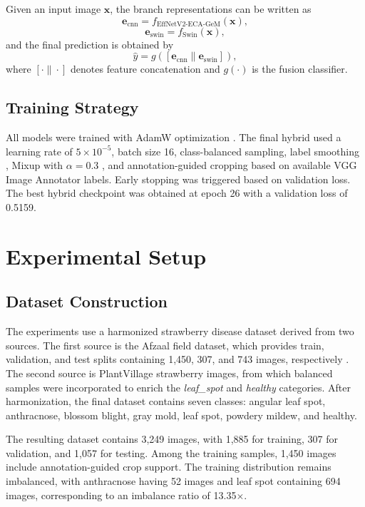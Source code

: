 \documentclass[conference]{IEEEtran}
\begin{document}
Given an input image $\mathbf{x}$, the branch representations can be written as
\begin{equation}
\mathbf{e}_{\text{cnn}} = f_{\text{EffNetV2-ECA-GeM}}(\mathbf{x}),
\end{equation}
\begin{equation}
\mathbf{e}_{\text{swin}} = f_{\text{Swin}}(\mathbf{x}),
\end{equation}
and the final prediction is obtained by
\begin{equation}
\hat{y} = g([\mathbf{e}_{\text{cnn}} \| \mathbf{e}_{\text{swin}}]),
\end{equation}
where $[\cdot \| \cdot]$ denotes feature concatenation and $g(\cdot)$ is the fusion classifier.

\subsection{Training Strategy}
All models were trained with AdamW optimization \cite{adamw2019}. The final hybrid used a learning rate of $5\times10^{-5}$, batch size 16, class-balanced sampling, label smoothing \cite{labelsmooth2016}, Mixup with $\alpha=0.3$ \cite{mixup2018}, and annotation-guided cropping based on available VGG Image Annotator labels. Early stopping was triggered based on validation loss. The best hybrid checkpoint was obtained at epoch 26 with a validation loss of 0.5159.

\section{Experimental Setup}
\subsection{Dataset Construction}
The experiments use a harmonized strawberry disease dataset derived from two sources. The first source is the Afzaal field dataset, which provides train, validation, and test splits containing 1,450, 307, and 743 images, respectively \cite{afzaal2021}. The second source is PlantVillage strawberry images, from which balanced samples were incorporated to enrich the \textit{leaf\_spot} and \textit{healthy} categories. After harmonization, the final dataset contains seven classes: angular leaf spot, anthracnose, blossom blight, gray mold, leaf spot, powdery mildew, and healthy.

The resulting dataset contains 3,249 images, with 1,885 for training, 307 for validation, and 1,057 for testing. Among the training samples, 1,450 images include annotation-guided crop support. The training distribution remains imbalanced, with anthracnose having 52 images and leaf spot containing 694 images, corresponding to an imbalance ratio of 13.35$\times$.
\end{document}
